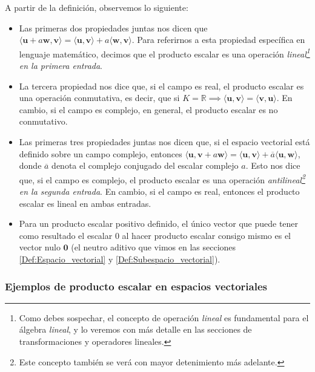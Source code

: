 \documentclass[12pt,dvipsnames]{article}
\begin{document}
\begin{tcolorbox}
\end{tcolorbox}{}

A partir de la definición, observemos lo siguiente:

\begin{itemize}
    \item Las primeras dos propiedades juntas nos dicen que $\langle\mathbf{u}+a\mathbf{w},\mathbf{v}\rangle = \langle\mathbf{u},\mathbf{v}\rangle+a\langle\mathbf{w},\mathbf{v}\rangle$. Para referirnos a esta propiedad específica en lenguaje matemático, decimos que el producto escalar es una operación \textit{lineal\footnote{Como debes sospechar, el concepto de operación \emph{lineal} es fundamental para el álgebra \emph{lineal}, y lo veremos con más detalle en las secciones de transformaciones y operadores lineales.} en la primera entrada}.
    \item La tercera propiedad nos dice que, si el campo es real, el producto escalar es una operación conmutativa, es decir, que si $K=\mathbb{R}\implies\langle\mathbf{u},\mathbf{v}\rangle=\langle\mathbf{v},\mathbf{u}\rangle$. En cambio, si el campo es complejo, en general, el producto escalar es no conmutativo.
    \item Las primeras tres propiedades juntas nos dicen que, si el espacio vectorial está definido sobre un campo complejo, entonces $\langle\mathbf{u},\mathbf{v}+a\mathbf{w}\rangle = \langle\mathbf{u},\mathbf{v}\rangle+\overline{a}\langle\mathbf{u},\mathbf{w}\rangle$, donde $\overline{a}$ denota el complejo conjugado del escalar complejo $a$. Esto nos dice que, si el campo es complejo, el producto escalar es una operación \textit{antilineal\footnote{Este concepto también se verá con mayor detenimiento más adelante.} en la segunda entrada}. En cambio, si el campo es real, entonces el producto escalar es lineal en ambas entradas.
    \item Para un producto escalar positivo definido, el único vector que puede tener como resultado el escalar $0$ al hacer producto escalar consigo mismo es el vector nulo $\mathbf{0}$ (el neutro aditivo que vimos en las secciones \ref{Def:Espacio_vectorial} y \ref{Def:Subespacio_vectorial}).
\end{itemize}


\subsubsection{Ejemplos de producto escalar en espacios vectoriales} \label{Ejem:Producto_escalar}
\end{document}
